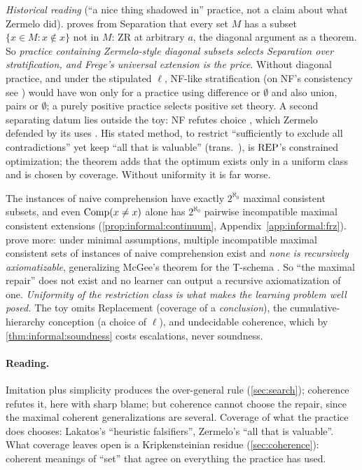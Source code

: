 \emph{Historical reading} (``a nice thing shadowed in'' practice, not a claim about what Zermelo did).  proves from Separation that every set $M$ has a subset $\{x\in M:x\notin x\}$ not in $M$: ZR at arbitrary $a$, the diagonal argument as a theorem. So \emph{practice containing Zermelo-style diagonal subsets selects Separation over stratification, and Frege's universal extension is the price}. Without diagonal practice, and under the stipulated $\ell$, NF-like stratification (on NF's consistency see \citealt{holmes2015nf}) would have won only for a practice using difference or $\emptyset$ and also union, pairs or $\emptyset$; a purely positive practice selects positive set theory. A second separating datum lies outside the toy: NF refutes choice \citep{specker1953axiom}, which Zermelo defended by its uses \citep{moore1982zermelo}. His stated method, to restrict ``sufficiently to exclude all contradictions'' yet keep ``all that is valuable'' \citep{zermelo1908untersuchungen} (trans.\ \citealt[p.~200]{vanheijenoort1967from}), is $\mathrm{REP}$'s constrained optimization; the theorem adds that the optimum exists only in a uniform class and is chosen by coverage. Without uniformity it is far worse.

The instances of naive comprehension have exactly $2^{\aleph_0}$ maximal consistent subsets, and even $\mathrm{Comp}(x\ne x)$ alone has $2^{\aleph_0}$ pairwise incompatible maximal consistent extensions (\cref{prop:informal:continuum}, Appendix~\ref{app:informal:frz}).  prove more: under minimal assumptions, multiple incompatible maximal consistent sets of instances of naive comprehension exist and \emph{none is recursively axiomatizable}, generalizing McGee's theorem for the T-schema \citep{mcgee1992maximal}. So ``the maximal repair'' does not exist and no learner can output a recursive axiomatization of one. \emph{Uniformity of the restriction class is what makes the learning problem well posed.} The toy omits Replacement (coverage of a \emph{conclusion}), the cumulative-hierarchy conception (a choice of $\ell$), and undecidable coherence, which by \cref{thm:informal:soundness} costs escalations, never soundness.

\paragraph{Reading.}
Imitation plus simplicity produces the over-general rule (\cref{sec:search}); coherence refutes it, here with sharp blame; but coherence cannot choose the repair, since the maximal coherent generalizations are several. Coverage of what the practice does chooses: Lakatos's ``heuristic falsifiers'', Zermelo's ``all that is valuable''. What coverage leaves open is a Kripkensteinian residue (\cref{sec:coherence}): coherent meanings of ``set'' that agree on everything the practice has used.

